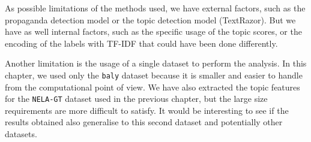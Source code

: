 As possible limitations of the methods used, we have external factors, such as the propaganda detection model or the topic detection model (TextRazor). But we have as well internal factors, such as the specific usage of the topic scores, or the encoding of the labels with TF-IDF that could have been done differently.

Another limitation is the usage of a single dataset to perform the analysis.
In this chapter, we used only the \texttt{baly} dataset because it is smaller and easier to handle from the computational point of view. We have also extracted the topic features for the \texttt{NELA-GT} dataset used in the previous chapter, but the large size requirements are more difficult to satisfy. It would be interesting to see if the results obtained also generalise to this second dataset and potentially other datasets.
